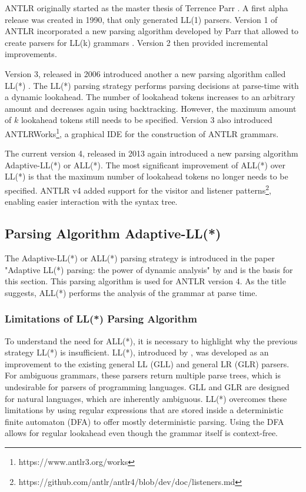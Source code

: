 ANTLR originally started as the master thesis of Terrence Parr \parencite{PCCTSHistory1994}. A first alpha release was created in 1990, that only generated LL(1) parsers. Version 1 of ANTLR incorporated a new parsing algorithm developed by Parr that allowed to create parsers for LL(k) grammars \parencite{parrPhd1993}. Version 2 then provided incremental improvements.   

Version 3, released in 2006 introduced another a new parsing algorithm called LL(*) \parencite{LLSParsing2011}. The LL(*) parsing strategy performs parsing decisions at parse-time with a dynamic lookahead. The number of lookahead tokens increases to an arbitrary amount and decreases again using backtracking. However, the maximum amount of $k$ lookahead tokens still needs to be specified. Version 3 also introduced ANTLRWorks\footnote{https://www.antlr3.org/works}, a graphical IDE for the construction of ANTLR grammars.

The current version 4, released in 2013 again introduced a new parsing algorithm Adaptive-LL(*) or ALL(*). The most significant improvement of ALL(*) over LL(*) is that the maximum number of lookahead tokens no longer needs to be specified. ANTLR v4 added support for the visitor and listener patterns\footnote{https://github.com/antlr/antlr4/blob/dev/doc/listeners.md}, enabling easier interaction with the syntax tree. 

\subsection{Parsing Algorithm Adaptive-LL(*)}
\label{sec:allstar}

The Adaptive-LL(*) or ALL(*) parsing strategy is introduced in the paper "Adaptive LL(*) parsing: the power of dynamic analysis" by \textcite{ALLParsing2014} and is the basis for this section. This parsing algorithm is used  for ANTLR version 4. As the title suggests, ALL(*) performs the analysis of the grammar at parse time. 

\subsubsection{Limitations of LL(*) Parsing Algorithm}

To understand the need for ALL(*), it is necessary to highlight why the previous strategy LL(*) is insufficient. LL(*), introduced by \textcite{parr2011ll}, was developed as an improvement to the existing general LL (GLL) \parencite{GLL2010} and general LR (GLR) \parencite{tomita1991generalized} parsers. For ambiguous grammars, these parsers return multiple parse trees, which is undesirable for parsers of programming languages. GLL and GLR are  designed for natural languages, which are inherently ambiguous. LL(*) overcomes these limitations by using regular expressions that are stored inside a deterministic finite automaton (DFA) to offer mostly deterministic parsing. Using the DFA allows for regular lookahead even though the grammar itself is context-free. 

